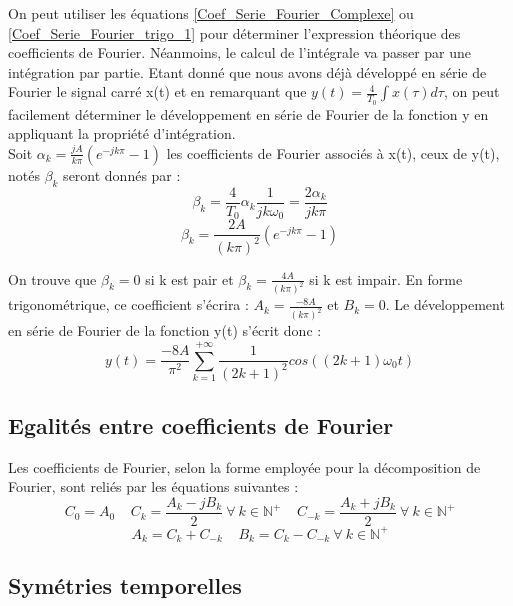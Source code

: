 	On peut utiliser les équations \ref{Coef_Serie_Fourier_Complexe} ou \ref{Coef_Serie_Fourier_trigo_1} pour déterminer l'expression théorique des coefficients de Fourier. Néanmoins, le calcul de l'intégrale va passer par une intégration par partie. Etant donné que nous avons déjà développé en série de Fourier le signal carré x(t) et en remarquant que $y(t)=\frac{4}{T_0}\int x(\tau)d\tau$, on peut facilement déterminer le développement en série de Fourier de la fonction y en appliquant la propriété d'intégration.  \\
	Soit $\alpha_{k}=\frac{jA}{k\pi}(e^{-jk\pi}-1)$ les coefficients de Fourier associés à x(t), ceux de y(t), notés $\beta_{k}$ seront donnés par :
	\begin{equation*}
	\beta_{k} = \frac{4}{T_0}\alpha_{k}\frac{1}{jk\omega_{0}}=\frac{2\alpha_{k}}{jk\pi}
	\end{equation*}
	\begin{equation*}
	\beta_{k} =\frac{2A}{(k\pi)^{2}}(e^{-jk\pi}-1)
	\end{equation*}
	
	On trouve que $\beta_{k} = 0$ si k est pair et $\beta_k=\frac{4A}{(k\pi)^{2}}$ si k est impair. En forme trigonométrique, ce coefficient s'écrira : $A_{k} = \frac{-8A}{(k\pi)^{2}}$ et $B_k = 0$. Le développement en série de Fourier de la fonction y(t) s'écrit donc :
	\begin{equation*}
	y(t)=\frac{-8A}{\pi^{2}}\sum_{k=1}^{+\infty}\frac{1}{(2k+1)^{2}}cos((2k+1)\omega_{0}t)
	\end{equation*}
	
	\subsection{Egalités entre coefficients de Fourier}
	Les coefficients de Fourier, selon la forme employée pour la décomposition de Fourier, sont reliés par les équations suivantes :
	\begin{equation}\label{key}
	C_0=A_0~~~~~C_k=\frac{A_k-jB_k}{2}~\forall~k \in \mathbb{N^{+}}~~~~~C_{-k}=\frac{A_k+jB_k}{2}~\forall~k \in \mathbb{N^{+}}
	\end{equation}
	\begin{equation}\label{key}
	A_k=C_k+C_{-k}~~~~~B_k=C_k-C_{-k}~\forall~k \in \mathbb{N^{+}}
	\end{equation}
	
	\subsection{Symétries temporelles}
	
